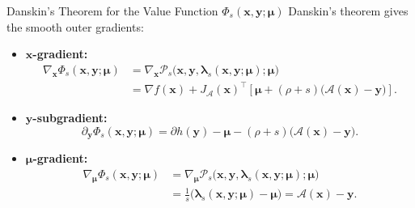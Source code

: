 \documentclass[handout,compress,9pt]{beamer}
\newcommand{\blue}[1]{\textcolor{ddlblue}{#1}}
\newcommand{\red}[1]{\textcolor{ddlred}{#1}}
\newcommand{\bx}{\bm{x}}
\newcommand{\by}{\bm{y}}
\newcommand{\bmu}{\bm{\mu}}
\newcommand{\blmbd}{\bm{\lambda}}
\newcommand{\calA}{\mathcal{A}}
\begin{document}
\begin{frame}{Danskin's Theorem for the Value Function $ \Phi_s(\bx,\by;\bmu)$}
Danskin's theorem gives the smooth outer gradients: \hyperlink{appendix:danskin-theorem}{%
}
\begin{itemize}
\setlength{\itemsep}{0.10cm}

\item[\blue{$\triangleright$}]
\textbf{$\bx$-gradient:}
\begin{equation*}
\begin{aligned}
  \nabla_{\bx}\Phi_s(\bx,\by;\bmu)
  &=\nabla_{\bx}\mathcal P_s
  \bigl(\bx,\by,\blmbd_s(\bx,\by;\bmu);\bmu\bigr)\\
  &=\nabla f(\bx)+J_{\calA}(\bx)^\top
  \left[\bmu+(\rho+s)\bigl(\calA(\bx)-\by\bigr)\right].
\end{aligned}
\end{equation*}

\item[\blue{$\triangleright$}]
\textbf{$\by$-subgradient:}
\begin{equation*}
  \partial_{\by}\Phi_s(\bx,\by;\bmu)
  =\partial h(\by)-\bmu-(\rho+s)\bigl(\calA(\bx)-\by\bigr).
\end{equation*}

\item[\blue{$\triangleright$}]
\textbf{$\bmu$-gradient:}
\begin{equation*}
\begin{aligned}
  \nabla_{\bmu}\Phi_s(\bx,\by;\bmu)
  &=\nabla_{\bmu}\mathcal P_s
  \bigl(\bx,\by,\blmbd_s(\bx,\by;\bmu);\bmu\bigr)\\
  &=\frac{1}{s}\bigl(\blmbd_s(\bx,\by;\bmu)-\bmu\bigr)
  =\calA(\bx)-\by.
\end{aligned}
\end{equation*}
\end{itemize}
\end{frame}
\end{document}
